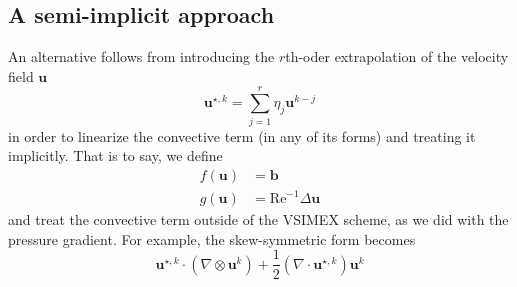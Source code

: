 \documentclass[]{scrartcl}
\begin{document}
\subsection{A semi-implicit approach}
An alternative follows from introducing the $r$th-oder extrapolation of the velocity field $\mathbf{u}$ 
\begin{equation*}
\mathbf{u}^{\star, k} = \sum_{j=1}^{r} \eta_j \mathbf{u}^{k-j}
\end{equation*}
in order to linearize the convective term (in any of its forms) and treating it implicitly. That is to say, we define
\begin{equation*}
\begin{aligned}
f(\mathbf{u}) &= \mathbf{b} \\
g(\mathbf{u}) &= \textrm{Re}^{-1} \Delta \mathbf{u}
\end{aligned}
\end{equation*}
and treat the convective term outside of the VSIMEX scheme, as we did with the pressure gradient. For example, the skew-symmetric form becomes
\begin{equation*}
	\mathbf{u}^{\star, k} \cdot (\nabla \otimes \mathbf{u}^{k}) + \dfrac{1}{2} (\nabla \cdot \mathbf{u}^{\star, k})\mathbf{u}^{k}
\end{equation*}
\end{document}
